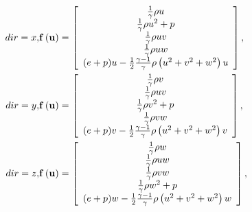 \documentclass{article}
\begin{document}
\begin{eqnarray} dir = x, & {\bf f}\left({\bf u}\right) = \left[\begin{array}{c} \frac{1}{\gamma}\rho u \\ \frac{1}{\gamma}\rho u^2 + p \\ \frac{1}{\gamma}\rho u v \\ \frac{1}{\gamma}\rho u w \\ (e+p)u - \frac{1}{2} \frac{\gamma-1}{\gamma}\rho\left(u^2+v^2+w^2\right)u \end{array}\right], \\ dir = y, & {\bf f}\left({\bf u}\right) = \left[\begin{array}{c} \frac{1}{\gamma}\rho v \\ \frac{1}{\gamma}\rho u v \\ \frac{1}{\gamma}\rho v^2 + p \\ \frac{1}{\gamma}\rho v w \\ (e+p)v - \frac{1}{2} \frac{\gamma-1}{\gamma}\rho\left(u^2+v^2+w^2\right)v \end{array}\right], \\ dir = z, & {\bf f}\left({\bf u}\right) = \left[\begin{array}{c} \frac{1}{\gamma}\rho w \\ \frac{1}{\gamma}\rho u w \\ \frac{1}{\gamma}\rho v w \\ \frac{1}{\gamma}\rho w^2 + p \\ (e+p)w - \frac{1}{2} \frac{\gamma-1}{\gamma}\rho\left(u^2+v^2+w^2\right)w \end{array}\right], \\ \end{eqnarray}
\pagebreak
\end{document}
